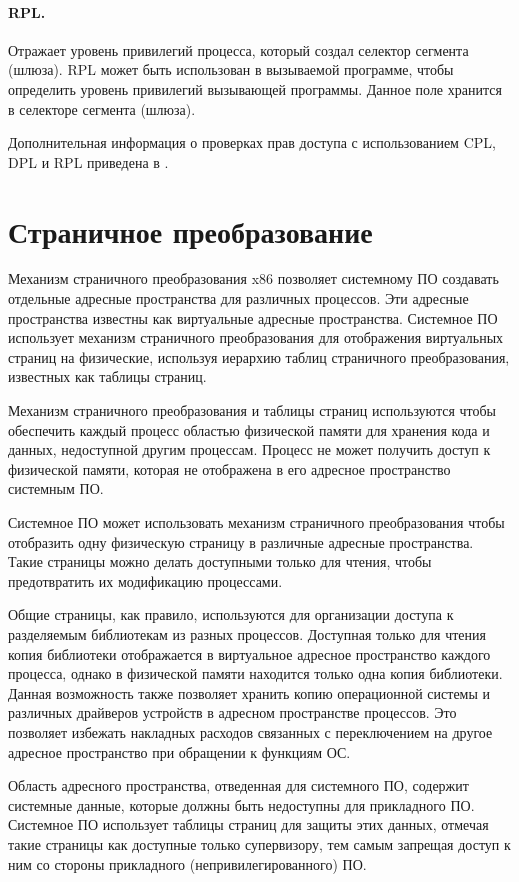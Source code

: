 \paragraph{RPL.} Отражает уровень привилегий процесса, который создал селектор сегмента (шлюза). RPL может быть использован
в вызываемой программе, чтобы определить уровень привилегий вызывающей программы. Данное поле хранится
в селекторе сегмента (шлюза).

Дополнительная информация о проверках прав доступа с использованием CPL, DPL и RPL приведена в \cite{amd_pm_v2}.



\section{Страничное преобразование}
\label{sec:page_translation}
Механизм страничного преобразования x86 позволяет системному ПО создавать отдельные адресные
пространства для различных процессов. Эти адресные пространства известны как
виртуальные адресные пространства. Системное ПО использует механизм страничного преобразования
для отображения виртуальных страниц на физические, используя иерархию таблиц страничного преобразования,
известных как таблицы страниц.

Механизм страничного преобразования и таблицы страниц используются чтобы обеспечить
каждый процесс областью физической памяти для хранения кода и данных, недоступной другим процессам.
Процесс не может получить доступ к физической памяти, которая не отображена в его адресное
пространство системным ПО.

Системное ПО может использовать механизм страничного преобразования чтобы отобразить одну физическую
страницу в различные адресные пространства. Такие страницы можно делать доступными только для чтения,
чтобы предотвратить их модификацию процессами.

Общие страницы, как правило, используются для организации доступа к разделяемым библиотекам из
разных процессов. Доступная только для чтения копия библиотеки отображается в виртуальное адресное
пространство каждого процесса, однако в физической памяти находится только одна копия библиотеки.
Данная возможность также позволяет хранить копию операционной системы и различных драйверов устройств
в адресном пространстве процессов. Это позволяет избежать накладных расходов связанных с переключением
на другое адресное пространство при обращении к функциям ОС.

Область адресного пространства, отведенная для системного ПО, содержит системные данные, которые
должны быть недоступны для прикладного ПО. Системное ПО использует таблицы страниц для защиты этих
данных, отмечая такие страницы как доступные только супервизору, тем самым запрещая доступ к ним со
стороны прикладного (непривилегированного) ПО.

